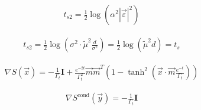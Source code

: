 \documentclass[11pt,a4paper]{article}
\begin{document}
\begin{align}
t_{s2} = \frac{1}{2}\log\left(\alpha^2|\vec{\varepsilon}|^2\right)
\end{align}

\begin{align}
t_{s2} = \frac{1}{2}\log\left(\sigma^2 \cdot \tilde{\mu}^2\frac{d}{\sigma^2}\right) = \frac{1}{2}\log\left(\tilde{\mu}^2 d\right) = t_s
\end{align}

\begin{align}
\nabla S(\vec{x}) = -\frac{1}{\Gamma_t}\mathbf{I} + \frac{e^{-2t}}{\Gamma_t^2}\vec{m}\vec{m}^T\left(1 - \tanh^2\left(\vec{x}\cdot\vec{m}\frac{e^{-t}}{\Gamma_t}\right)\right)
\end{align}

\begin{align}
\nabla S^{\text{cond}}(\vec{y}) = -\frac{1}{\Gamma_t}\mathbf{I}
\end{align}
\end{document}
